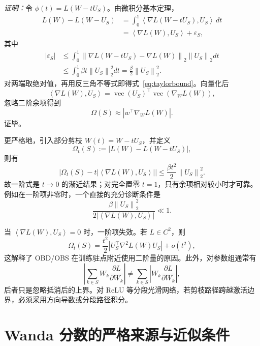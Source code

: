 \documentclass[conference,a4paper]{IEEEtran}
\newcommand{\inner}[2]{\left\langle #1,#2\right\rangle}
\newcommand{\norm}[1]{\left\lVert #1\right\rVert}
\begin{document}
\textit{证明：}令 $\phi(t)=L(W-tU_S)$。由微积分基本定理，
\begin{align}
L(W)-L(W-U_S)
&=\int_0^1\inner{\nabla L(W-tU_S)}{U_S}\,dt\\
&=\inner{\nabla L(W)}{U_S}+\varepsilon_S,
\end{align}
其中
\begin{align}
|\varepsilon_S|
&\leq\int_0^1\norm{\nabla L(W-tU_S)-\nabla L(W)}_2
\norm{U_S}_2dt\\
&\leq\int_0^1\beta t\norm{U_S}_2^2dt
=\frac{\beta}{2}\norm{U_S}_2^2.
\end{align}
对两端取绝对值，再用反三角不等式即得式~\eqref{eq:taylorbound}。向量化后
\begin{equation}
\inner{\nabla L(W)}{U_S}
=\operatorname{vec}(U_S)^\top\operatorname{vec}(\nabla_WL(W)),
\end{equation}
忽略二阶余项得到
\begin{equation}
\boxed{\Omega(S)\approx|w^\top\nabla_WL(W)|.}
\end{equation}
证毕。

更严格地，引入部分剪枝 $W(t)=W-tU_S$，并定义
\begin{equation}
\Omega_t(S):=|L(W)-L(W-tU_S)|,
\end{equation}
则有
\begin{equation}
\left|\Omega_t(S)-t\left|\inner{\nabla L(W)}{U_S}\right|\right|
\leq\frac{\beta t^2}{2}\norm{U_S}_2^2.
\end{equation}
故一阶式是 $t\to0$ 的渐近结果；对完全置零 $t=1$，只有余项相对较小时才可靠。例如在一阶项非零时，一个直接的充分诊断条件是
\begin{equation}
\frac{\beta\norm{U_S}_2^2}
{2|\inner{\nabla L(W)}{U_S}|}\ll1.
\end{equation}

当 $\inner{\nabla L(W)}{U_S}=0$ 时，一阶项失效。若 $L\in C^2$，则
\begin{equation}
\Omega_t(S)=\frac{t^2}{2}
\left|U_S^\top\nabla^2L(W)U_S\right|+o(t^2),
\end{equation}
这解释了 OBD/OBS 在训练驻点附近使用二阶量的原因\cite{lecun1989obd,hassibi1993obs}。此外，对参数组通常有
\begin{equation}
\left|\sum_{k\in S}W_k\frac{\partial L}{\partial W_k}\right|
\neq\sum_{k\in S}\left|W_k\frac{\partial L}{\partial W_k}\right|,
\end{equation}
后者只是忽略抵消后的上界。对 ReLU 等分段光滑网络，若剪枝路径跨越激活边界，必须采用方向导数或分段路径积分。

\section{Wanda 分数的严格来源与近似条件}
\end{document}
